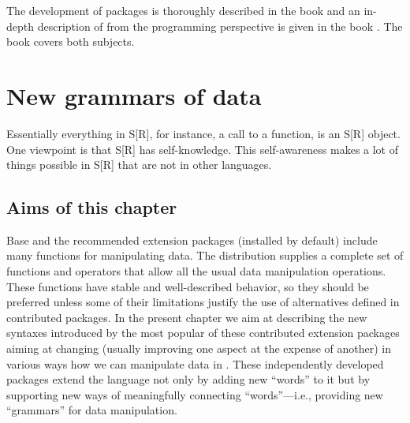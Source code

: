 \documentclass[krantz2]{krantz}\usepackage{knitr}
\begin{document}
The development of packages is thoroughly described in the book  \autocite{Wickham2015} and an in-depth description of \Rlang from the programming perspective is given in the book  \autocite{Wickham2019}. The book  \autocite{Chambers2016} covers both subjects.








\chapter{New grammars of data}\label{chap:R:data}

\begin{VF}
Essentially everything in S[R], for instance, a call to a function, is an S[R] object. One viewpoint is that S[R] has self-knowledge. This self-awareness makes a lot of things possible in S[R] that are not in other languages.

\nocite{Burns1998}
\end{VF}


\section{Aims of this chapter}

Base \Rlang and the recommended extension packages (installed by default) include many functions for manipulating data. The \Rlang distribution supplies a complete set of functions and operators that allow all the usual data manipulation operations. These functions have stable and well-described behavior, so they should be preferred unless some of their limitations justify the use of alternatives defined in contributed packages. In the present chapter we aim at describing the new syntaxes introduced by the most popular of these contributed \Rlang extension packages aiming at changing (usually improving one aspect at the expense of another) in various ways how we can manipulate data in \Rlang. These independently developed packages extend the \Rlang language not only by adding new ``words'' to it but by supporting new ways of meaningfully connecting ``words''---i.e., providing new ``grammars'' for data manipulation.
\end{document}
